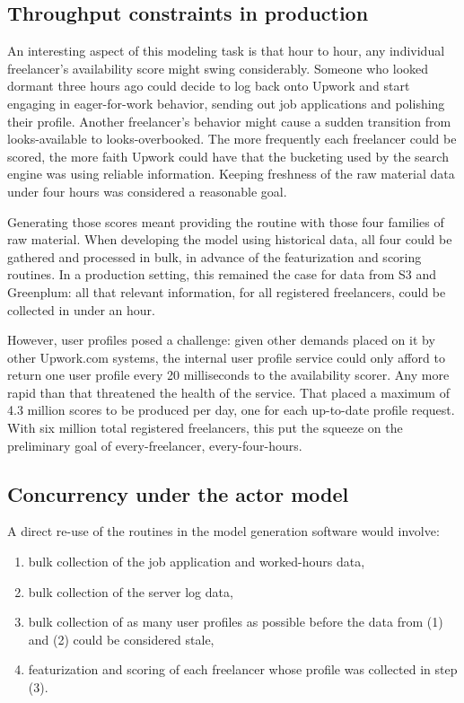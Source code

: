 \documentclass{article}
\begin{document}
\subsection{Throughput constraints in production}

 An interesting aspect of this modeling task is that hour to hour, any
individual freelancer's availability score might swing considerably. Someone who
looked dormant three hours ago could decide to log back onto Upwork and start
engaging in eager-for-work behavior, sending out job applications and polishing
their profile. Another freelancer's behavior might cause a sudden transition
from looks-available to looks-overbooked. The more frequently each freelancer
could be scored, the more faith Upwork could have that the bucketing used by the
search engine was using reliable information. Keeping freshness of the raw
material data under four hours was considered a reasonable goal.

 Generating those scores meant providing the routine with those four families of
raw material. When developing the model using historical data, all four could be
gathered and processed in bulk, in advance of the featurization and scoring
routines. In a production setting, this remained the case for data from S3 and
Greenplum: all that relevant information, for all registered freelancers, could
be collected in under an hour.

 However, user profiles posed a challenge: given other demands placed on it by
other Upwork.com systems, the internal user profile service could only afford to
return one user profile every 20 milliseconds to the availability scorer. Any
more rapid than that threatened the health of the service. That placed a maximum
of 4.3 million scores to be produced per day, one for each up-to-date profile
request. With six million total registered freelancers, this put the squeeze on
the preliminary goal of every-freelancer, every-four-hours.

\subsection{Concurrency under the actor model}

 A direct re-use of the routines in the model generation software would involve:

\begin{enumerate}
\item bulk collection of the job application and worked-hours data,
\item bulk collection of the server log data,
 \item bulk collection of as many user profiles as possible before the data from
(1) and (2) could be considered stale,
 \item featurization and scoring of each freelancer whose profile was collected
in step (3).
\end{enumerate}
\end{document}
